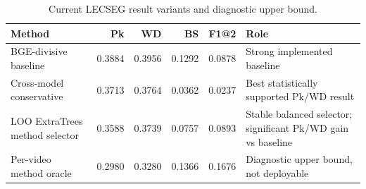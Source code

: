 \begin{table}[t]
\centering
\small
\caption{Current LECSEG result variants and diagnostic upper bound.}
\label{tab:lecseg_result_variants}
\begin{tabularx}{\linewidth}{lrrrrX}
\toprule
Method & Pk & WD & BS & F1@2 & Role \\
\midrule
BGE-divisive baseline & 0.3884 & 0.3956 & 0.1292 & 0.0878 & Strong implemented baseline \\
Cross-model conservative & 0.3713 & 0.3764 & 0.0362 & 0.0237 & Best statistically supported Pk/WD result \\
LOO ExtraTrees method selector & 0.3588 & 0.3739 & 0.0757 & 0.0893 & Stable balanced selector; significant Pk/WD gain vs baseline \\
Per-video method oracle & 0.2980 & 0.3280 & 0.1366 & 0.1676 & Diagnostic upper bound, not deployable \\
\bottomrule
\end{tabularx}
\end{table}